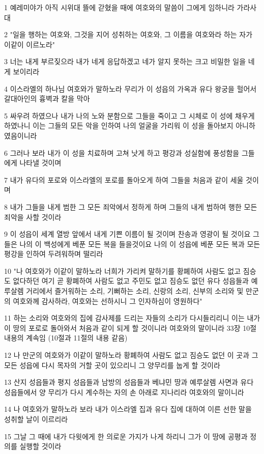 \par 1 예레미야가 아직 시위대 뜰에 갇혔을 때에 여호와의 말씀이 그에게 임하니라 가라사대
\par 2 "일을 행하는 여호와, 그것을 지어 성취하는 여호와, 그 이름을 여호와라 하는 자가 이같이 이르노라"
\par 3 너는 내게 부르짖으라 내가 네게 응답하겠고 네가 알지 못하는 크고 비밀한 일을 네게 보이리라
\par 4 이스라엘의 하나님 여호와가 말하노라 무리가 이 성읍의 가옥과 유다 왕궁을 헐어서 갈대아인의 흉벽과 칼을 막아
\par 5 싸우려 하였으나 내가 나의 노와 분함으로 그들을 죽이고 그 시체로 이 성에 채우게 하였나니 이는 그들의 모든 악을 인하여 나의 얼굴을 가리워 이 성을 돌아보지 아니하였음이니라
\par 6 그러나 보라 내가 이 성을 치료하며 고쳐 낫게 하고 평강과 성실함에 풍성함을 그들에게 나타낼 것이며
\par 7 내가 유다의 포로와 이스라엘의 포로를 돌아오게 하여 그들을 처음과 같이 세울 것이며
\par 8 내가 그들을 내게 범한 그 모든 죄악에서 정하게 하며 그들의 내게 범하여 행한 모든 죄악을 사할 것이라
\par 9 이 성읍이 세계 열방 앞에서 내게 기쁜 이름이 될 것이며 찬송과 영광이 될 것이요 그들은 나의 이 백성에게 베푼 모든 복을 들을것이요 나의 이 성읍에 베푼 모든 복과 모든 평강을 인하여 두려워하며 떨리라
\par 10 "나 여호와가 이같이 말하노라 너희가 가리켜 말하기를 황폐하여 사람도 없고 짐승도 없다하던 여기 곧 황폐하여 사람도 없고 주민도 없고 짐승도 없던 유다 성읍들과 예루살렘 거리에서 즐거워하는 소리, 기뻐하는 소리, 신랑의 소리, 신부의 소리와 및 만군의 여호와께 감사하라, 여호와는 선하시니 그 인자하심이 영원하다"
\par 11 하는 소리와 여호와의 집에 감사제를 드리는 자들의 소리가 다시들리리니 이는 내가 이 땅의 포로로 돌아와서 처음과 같이 되게 할 것이니라 여호와의 말이니라 33장 10절 내용의 계속임 (10절과 11절의 내용 같음)
\par 12 나 만군의 여호와가 이같이 말하노라 황폐하여 사람도 없고 짐승도 없던 이 곳과 그 모든 성읍에 다시 목자의 거할 곳이 있으리니 그 양무리를 눕게 할 것이라
\par 13 산지 성읍들과 평지 성읍들과 남방의 성읍들과 베냐민 땅과 예루살렘 사면과 유다 성읍들에서 양 무리가 다시 계수하는 자의 손 아래로 지나리라 여호와의 말이니라
\par 14 나 여호와가 말하노라 보라 내가 이스라엘 집과 유다 집에 대하여 이른 선한 말을 성취할 날이 이르리라
\par 15 그날 그 때에 내가 다윗에게 한 의로운 가지가 나게 하리니 그가 이 땅에 공평과 정의를 실행할 것이라
